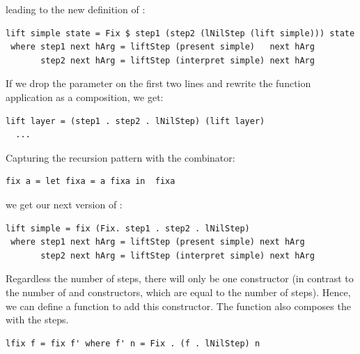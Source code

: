 \documentclass{llncs}
\begin{document}
\noindent leading to the new definition of :

\begin{small} %
\begin{verbatim}
lift simple state = Fix $ step1 (step2 (lNilStep (lift simple))) state
 where step1 next hArg = liftStep (present simple)   next hArg
       step2 next hArg = liftStep (interpret simple) next hArg 
\end{verbatim}%
\end{small}



If we drop the  parameter on the first two lines and rewrite the function application as a composition, we get:
\
\begin{small}
\begin{verbatim}
lift layer = (step1 . step2 . lNilStep) (lift layer)
  ...
\end{verbatim}
\end{small}

\noindent Capturing the recursion pattern with the  combinator:

\begin{small}
\begin{verbatim}
fix a = let fixa = a fixa in  fixa
\end{verbatim}
\end{small}

we get our next version of :

\begin{small} %
\begin{verbatim}
lift simple = fix (Fix. step1 . step2 . lNilStep)
 where step1 next hArg = liftStep (present simple) next hArg
       step2 next hArg = liftStep (interpret simple) next hArg
\end{verbatim}
\end{small}%


Regardless the number of steps, there will only be one  constructor (in contrast to the number of  and  constructors, which are equal to the number of steps). Hence, we can define a function  to add this constructor. The function  also composes the  with the steps. 

\begin{small}%
\begin{verbatim}
lfix f = fix f' where f' n = Fix . (f . lNilStep) n
\end{verbatim}
\end{small}
\end{document}
